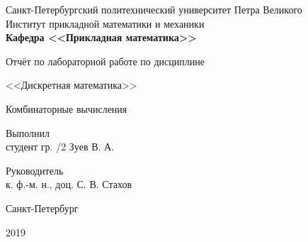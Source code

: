 \documentclass[zuev-report.tex]{subfiles}
\begin{document}
\begin{titlepage}
\begin{centering}

Санкт-Петербургский политехнический университет Петра Великого\\
Институт прикладной математики и механики\\

\textbf{Кафедра <<Прикладная математика>>}
\par
\vfill

\large
Отчёт по лабораторной работе по дисциплине\\
\par
<<Дискретная математика>>
\par
\Large{Комбинаторные вычисления}
\normalsize
\vfill

\begin{flushleft}
Выполнил\\
студент гр. /2 \hfill Зуев В. А.\\
\end{flushleft}
\begin{flushleft}
Руководитель\\
к. ф.-м. н., доц. \hfill С. В. Стахов\\ %
\end{flushleft}
\vfill

Санкт-Петербург
\par
2019

\end{centering}
\end{titlepage}
\end{document}
